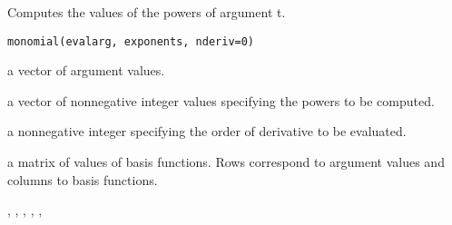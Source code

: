 \documentclass{article}
\begin{document}
\begin{Description}\relax
Computes the values of the powers of argument t.
\end{Description}
\begin{Usage}
\begin{verbatim}
monomial(evalarg, exponents, nderiv=0)
\end{verbatim}
\end{Usage}
\begin{Arguments}
\begin{ldescription}
\item[\code{evalarg}] a vector of argument values.

\item[\code{exponents}] a vector of nonnegative integer values specifying the
powers to be computed.

\item[\code{nderiv}] a nonnegative integer specifying the order of derivative to be
evaluated.

\end{ldescription}
\end{Arguments}
\begin{Value}
a matrix of values of basis functions.  Rows correspond to
argument values and columns to basis functions.
\end{Value}
\begin{SeeAlso}\relax
{}, 
, 
, 
, 
, 
\end{SeeAlso}
\begin{Examples}
\end{Examples}
\end{document}
